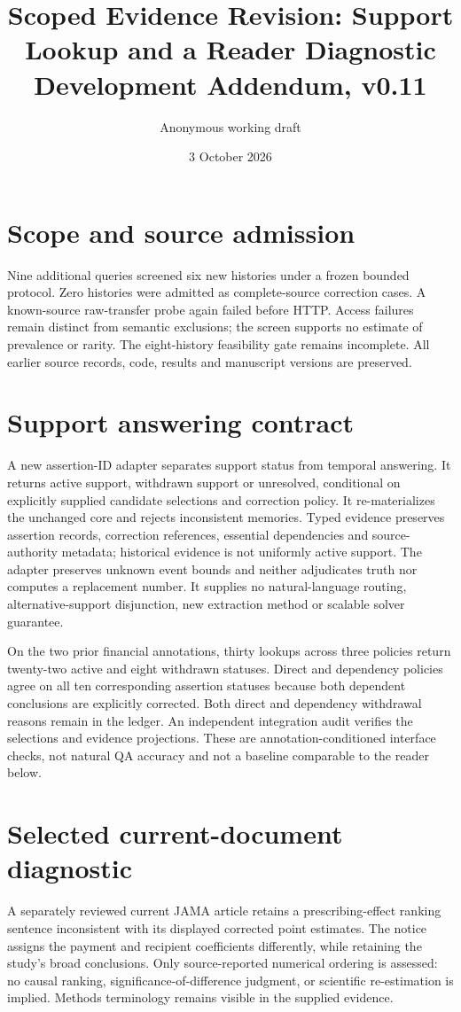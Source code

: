 \documentclass[11pt]{article}
\title{Scoped Evidence Revision: Support Lookup and a Reader Diagnostic\\Development Addendum, v0.11}
\author{Anonymous working draft}
\date{3 October 2026}
\begin{document}
\maketitle

\section{Scope and source admission}\label{sec:v11scope}
Nine additional queries screened six new histories under a frozen bounded protocol. Zero histories were admitted as complete-source correction cases. A known-source raw-transfer probe again failed before HTTP. Access failures remain distinct from semantic exclusions; the screen supports no estimate of prevalence or rarity. The eight-history feasibility gate remains incomplete. All earlier source records, code, results and manuscript versions are preserved.

\section{Support answering contract}\label{sec:v11support}
A new assertion-ID adapter separates support status from temporal answering. It returns active support, withdrawn support or unresolved, conditional on explicitly supplied candidate selections and correction policy. It re-materializes the unchanged core and rejects inconsistent memories. Typed evidence preserves assertion records, correction references, essential dependencies and source-authority metadata; historical evidence is not uniformly active support. The adapter preserves unknown event bounds and neither adjudicates truth nor computes a replacement number. It supplies no natural-language routing, alternative-support disjunction, new extraction method or scalable solver guarantee.

On the two prior financial annotations, thirty lookups across three policies return twenty-two active and eight withdrawn statuses. Direct and dependency policies agree on all ten corresponding assertion statuses because both dependent conclusions are explicitly corrected. Both direct and dependency withdrawal reasons remain in the ledger. An independent integration audit verifies the selections and evidence projections. These are annotation-conditioned interface checks, not natural QA accuracy and not a baseline comparable to the reader below.

\section{Selected current-document diagnostic}\label{sec:v11reader}
A separately reviewed current JAMA article retains a prescribing-effect ranking sentence inconsistent with its displayed corrected point estimates. The notice assigns the payment and recipient coefficients differently, while retaining the study's broad conclusions. Only source-reported numerical ordering is assessed: no causal ranking, significance-of-difference judgment, or scientific re-estimation is implied. Methods terminology remains visible in the supplied evidence.
\end{document}
